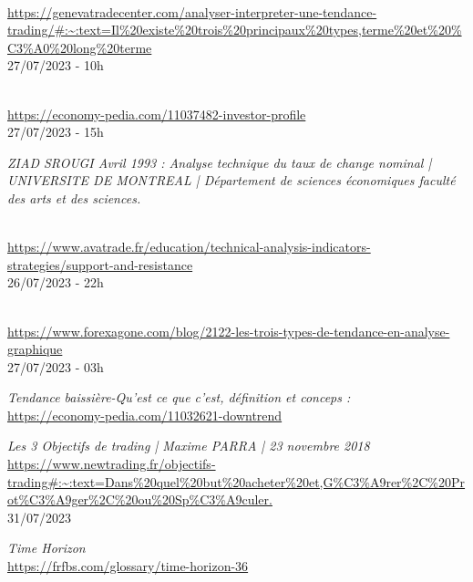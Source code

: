 
\begin{thebibliography}{13}
    \\
    \url{https://genevatradecenter.com/analyser-interpreter-une-tendance-trading/#:~:text=Il%20existe%20trois%20principaux%20types,terme%20et%20%C3%A0%20long%20terme}\\
    27/07/2023 - 10h
    
    \\
    \url{https://economy-pedia.com/11037482-investor-profile}\\
    27/07/2023 - 15h

    \textit{ZIAD SROUGI Avril 1993 : Analyse technique du taux de change nominal | UNIVERSITE DE MONTREAL | Département de sciences économiques faculté des arts et des sciences. }

    \\
    \url{https://www.avatrade.fr/education/technical-analysis-indicators-strategies/support-and-resistance}\\
    26/07/2023 - 22h

    \\
    \url{https://www.forexagone.com/blog/2122-les-trois-types-de-tendance-en-analyse-graphique} \\
    27/07/2023 - 03h 

    \textit{Tendance baissière-Qu'est ce que c'est, définition et conceps : }\\
    \url{https://economy-pedia.com/11032621-downtrend}

    \textit{Les 3 Objectifs de trading | Maxime PARRA | 23 novembre 2018}\\
    \url{https://www.newtrading.fr/objectifs-trading#:~:text=Dans%20quel%20but%20acheter%20et,G%C3%A9rer%2C%20Prot%C3%A9ger%2C%20ou%20Sp%C3%A9culer.}\\
    31/07/2023 

    \textit{Time Horizon }\\
    \url{https://frfbs.com/glossary/time-horizon-36 }


\end{thebibliography}
